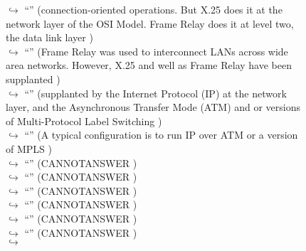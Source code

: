 \documentclass[11pt,a4paper, onecolumn]{article}
\begin{document}
\begin{figure}[t] \small \begin{tcolorbox}[boxsep=0pt,left=5pt,right=0pt,top=2pt,colback = yellow!5] \begin{dialogue}
 \small 
\colorbox{pink!25}{$\hookrightarrow$}
{ ``'' (connection-oriented operations. But X.25 does it at the network layer of the OSI Model. Frame Relay does it at level two, the data link layer ) }
\\
\colorbox{pink!25}{$\hookrightarrow$}
{ ``'' (Frame Relay was used to interconnect LANs across wide area networks. However, X.25 and well as Frame Relay have been supplanted ) }
\\
\colorbox{pink!25}{$\hookrightarrow$}
{ ``'' (supplanted by the Internet Protocol (IP) at the network layer, and the Asynchronous Transfer Mode (ATM) and or versions of Multi-Protocol Label Switching ) }
\\
\colorbox{pink!25}{$\hookrightarrow$}
{ ``'' (A typical configuration is to run IP over ATM or a version of MPLS ) }
\\
\colorbox{pink!25}{$\hookrightarrow$}
{ ``'' (CANNOTANSWER ) }
\\
\colorbox{pink!25}{$\hookrightarrow$}
{ ``'' (CANNOTANSWER ) }
\\
\colorbox{pink!25}{$\hookrightarrow$}
{ ``'' (CANNOTANSWER ) }
\\
\colorbox{pink!25}{$\hookrightarrow$}
{ ``'' (CANNOTANSWER ) }
\\
\colorbox{pink!25}{$\hookrightarrow$}
{ ``'' (CANNOTANSWER ) }
\\
\colorbox{pink!25}{$\hookrightarrow$}
{ ``'' (CANNOTANSWER ) }
\\
\colorbox{pink!25}{$\hookrightarrow$}

\end{dialogue}
\end{tcolorbox}
\end{figure}
\end{document}
